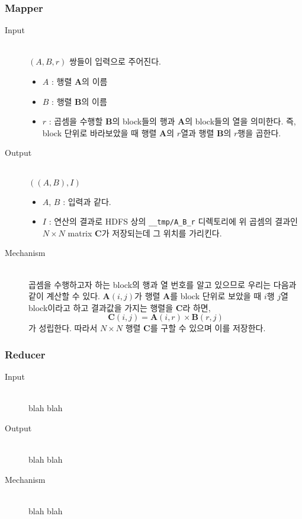 \documentclass[a4paper]{article}
\begin{document}
\begin{multicols}{2}
\subsubsection{Mapper}
\begin{description}
	\item[Input] \hfill \\
	$(A, B, r)$ 쌍들이 입력으로 주어진다.
	\begin{itemize}
		\item $A$ : 행렬 $\mathbf{A}$의 이름
		\item $B$ : 행렬 $\mathbf{B}$의 이름
		\item $r$ : 곱셈을 수행할 $\mathbf{B}$의 block들의 행과 $\mathbf{A}$의 block들의 열을 의미한다. 즉, block 단위로 바라보았을 때 행렬 $\mathbf{A}$의 $r$열과 행렬 $\mathbf{B}$의 $r$행을 곱한다.
	\end{itemize}
	\item[Output] \hfill \\
	$((A, B), I)$
	\begin{itemize}
		\item $A$, $B$ : 입력과 같다.
		\item $I$ : 연산의 결과로 HDFS 상의 \texttt{\_\_tmp/A\_B\_r} 디렉토리에 위 곱셈의 결과인 $N \times N$ matrix $\mathbf{C}$가 저장되는데 그 위치를 가리킨다.
	\end{itemize}
	\item[Mechanism] \hfill \\
	곱셈을 수행하고자 하는 block의 행과 열 번호를 알고 있으므로 우리는 다음과 같이 계산할 수 있다. $\mathbf{A}(i,j)$가 행렬 $\mathbf{A}$를 block 단위로 보았을 때 $i$행 $j$열 block이라고 하고 결과값을 가지는 행렬을 $\mathbf{C}$라 하면,
	\begin{equation*}
		\mathbf{C}(i,j) = \mathbf{A}(i,r) \times \mathbf{B}(r,j)
	\end{equation*}
	가 성립한다. 따라서 $N \times N$ 행렬 $\mathbf{C}$를 구할 수 있으며 이를 저장한다.
\end{description}
\subsubsection{Reducer}
\begin{description}
	\item[Input] \hfill \\
	blah blah
	\item[Output] \hfill \\
	blah blah
	\item[Mechanism] \hfill \\
	blah blah
\end{description}


\end{multicols}
\end{document}
